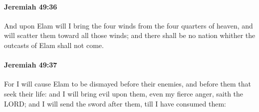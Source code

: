 		\paragraph{Jeremiah 49:36} %
			\label{JEREMIAH-49-36}

			And upon Elam will I bring the four winds from the four quarters of heaven, and will scatter them toward all those winds; and there shall be no nation whither the outcasts of Elam shall not come.


		\paragraph{Jeremiah 49:37} %
			\label{JEREMIAH-49-37}

			For I will cause Elam to be dismayed before their enemies, and before them that seek their life: and I will bring evil upon them, even my fierce anger, saith the LORD; and I will send the sword after them, till I have consumed them:

